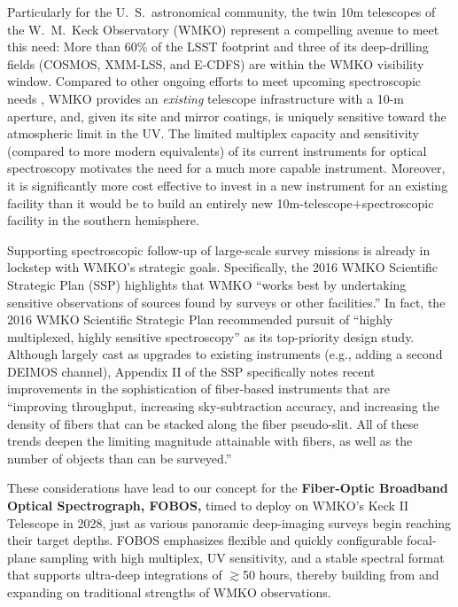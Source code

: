 \documentclass[11pt,a4paper,twoside,onecolumn,openany,final,oldfontcommands]{memoir}
\begin{document}
Particularly for the U.~S.\ astronomical community, the twin 10m telescopes of the W.~M.~Keck Observatory (WMKO) represent a compelling avenue to meet this need:  More than 60\% of the LSST footprint and three of its deep-drilling fields (COSMOS, XMM-LSS, and E-CDFS) are within the WMKO visibility window.  Compared to other ongoing efforts to meet upcoming spectroscopic needs \citep{mega2019, mse2019, spectel2019}, WMKO provides an \textit{existing} telescope infrastructure with a 10-m aperture, and, given its site and mirror coatings, is uniquely sensitive toward the atmospheric limit in the UV.  The limited multiplex capacity and sensitivity (compared to more modern equivalents) of its current instruments for optical spectroscopy motivates the need for a much more capable instrument.  Moreover, it is significantly more cost effective to invest in a new instrument for an existing facility than it would be to build an entirely new 10m-telescope$+$spectroscopic facility in the southern hemisphere.

Supporting spectroscopic follow-up of large-scale survey missions is already in lockstep with WMKO's strategic goals.  Specifically, the 2016 WMKO Scientific Strategic Plan (SSP) highlights that WMKO ``works best by undertaking sensitive observations of sources found by surveys or other facilities.''  In fact, the 2016 WMKO Scientific Strategic Plan recommended pursuit of ``highly multiplexed, highly sensitive spectroscopy'' as its top-priority design study.  Although largely cast as upgrades to existing instruments (e.g., adding a second DEIMOS channel), Appendix II of the SSP specifically notes recent improvements in the sophistication of fiber-based instruments that are ``improving throughput, increasing sky-subtraction accuracy, and increasing the density of fibers that can be stacked along the fiber pseudo-slit. All of these trends deepen the limiting magnitude attainable with fibers, as well as the number of objects than can be surveyed.''

These considerations have lead to our concept for the \textbf{Fiber-Optic Broadband Optical Spectrograph, FOBOS,} timed to deploy on WMKO's Keck II Telescope in 2028, just as various panoramic deep-imaging surveys begin reaching their target depths.  FOBOS emphasizes flexible and quickly configurable focal-plane sampling with high multiplex, UV sensitivity, and a stable spectral format that supports ultra-deep integrations of $\gtrsim$50 hours, thereby building from and expanding on traditional strengths of WMKO observations.
\end{document}
